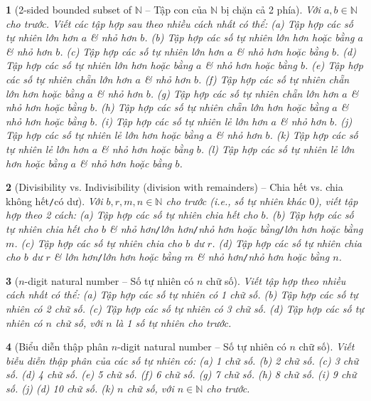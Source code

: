 \documentclass{article}
\newtheorem{baitoan}{}
\begin{document}
\begin{baitoan}[2-sided bounded subset of $\mathbb{N}$ -- Tập con của $\mathbb{N}$ bị chặn cả 2 phía]
	Với $a,b\in\mathbb{N}$ cho trước. Viết các tập hợp sau theo nhiều cách nhất có thể: (a) Tập hợp các số tự nhiên lớn hơn $a$ \& nhỏ hơn $b$. (b) Tập hợp các số tự nhiên lớn hơn hoặc bằng $a$ \& nhỏ hơn $b$. (c) Tập hợp các số tự nhiên lớn hơn $a$ \& nhỏ hơn hoặc bằng $b$. (d) Tập hợp các số tự nhiên lớn hơn hoặc bằng $a$ \& nhỏ hơn hoặc bằng $b$. (e) Tập hợp các số tự nhiên chẵn lớn hơn $a$ \& nhỏ hơn $b$. (f) Tập hợp các số tự nhiên chẵn lớn hơn hoặc bằng $a$ \& nhỏ hơn $b$. (g) Tập hợp các số tự nhiên chẵn lớn hơn $a$ \& nhỏ hơn hoặc bằng $b$. (h) Tập hợp các số tự nhiên chẵn lớn hơn hoặc bằng $a$ \& nhỏ hơn hoặc bằng $b$. (i) Tập hợp các số tự nhiên lẻ lớn hơn $a$ \& nhỏ hơn $b$. (j) Tập hợp các số tự nhiên lẻ lớn hơn hoặc bằng $a$ \& nhỏ hơn $b$. (k) Tập hợp các số tự nhiên lẻ lớn hơn $a$ \& nhỏ hơn hoặc bằng $b$. (l) Tập hợp các số tự nhiên lẻ lớn hơn hoặc bằng $a$ \& nhỏ hơn hoặc bằng $b$.
\end{baitoan}

\begin{baitoan}[Divisibility vs. Indivisibility (division with remainders) -- Chia hết vs. chia không hết{\tt/}có dư]
	Với $b,r,m,n\in\mathbb{N}$ cho trước (i.e., số tự nhiên khác $0$), viết tập hợp theo 2 cách: (a) Tập hợp các số tự nhiên chia hết cho $b$. (b) Tập hợp các số tự nhiên chia hết cho $b$ \& nhỏ hơn{\tt/}lớn hơn{\tt/}nhỏ hơn hoặc bằng{\tt/}lớn hơn hoặc bằng $m$. (c) Tập hợp các số tự nhiên chia cho $b$ dư $r$. (d) Tập hợp các số tự nhiên chia cho $b$ dư $r$ \& lớn hơn{\tt/}lớn hơn hoặc bằng $m$ \& nhỏ hơn{\tt/}nhỏ hơn hoặc bằng $n$.
\end{baitoan}

\begin{baitoan}[$n$-digit natural number -- Số tự nhiên có $n$ chữ số]
	Viết tập hợp theo nhiều cách nhất có thể: (a) Tập hợp các số tự nhiên có 1 chữ số. (b) Tập hợp các số tự nhiên có 2 chữ số. (c) Tập hợp các số tự nhiên có 3 chữ số. (d) Tập hợp các số tự nhiên có $n$ chữ số, với $n$ là 1 số tự nhiên cho trước.
\end{baitoan}

\begin{baitoan}[Biểu diễn thập phân $n$-digit natural number -- Số tự nhiên có $n$ chữ số]
	Viết biễu diễn thập phân của các số tự nhiên có: (a) 1 chữ số. (b) 2 chữ số. (c) 3 chữ số. (d) 4 chữ số. (e) 5 chữ số. (f) 6 chữ số. (g) 7 chữ số. (h) 8 chữ số. (i) 9 chữ số. (j) (d) 10 chữ số. (k) $n$ chữ số, với $n\in\mathbb{N}$ cho trước. 
\end{baitoan}
\end{document}
